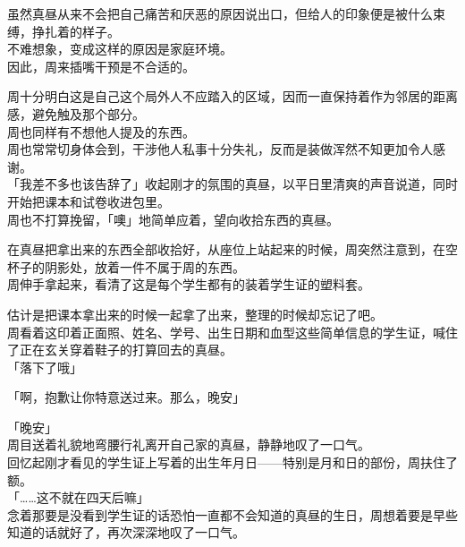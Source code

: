 虽然真昼从来不会把自己痛苦和厌恶的原因说出口，但给人的印象便是被什么束缚，挣扎着的样子。\\

不难想象，变成这样的原因是家庭环境。\\

因此，周来插嘴干预是不合适的。

周十分明白这是自己这个局外人不应踏入的区域，因而一直保持着作为邻居的距离感，避免触及那个部分。\\

周也同样有不想他人提及的东西。\\

周也常常切身体会到，干涉他人私事十分失礼，反而是装做浑然不知更加令人感谢。\\

「我差不多也该告辞了」收起刚才的氛围的真昼，以平日里清爽的声音说道，同时开始把课本和试卷收进包里。\\

周也不打算挽留，「噢」地简单应着，望向收拾东西的真昼。

在真昼把拿出来的东西全部收拾好，从座位上站起来的时候，周突然注意到，在空杯子的阴影处，放着一件不属于周的东西。\\

周伸手拿起来，看清了这是每个学生都有的装着学生证的塑料套。

估计是把课本拿出来的时候一起拿了出来，整理的时候却忘记了吧。\\

周看着这印着正面照、姓名、学号、出生日期和血型这些简单信息的学生证，喊住了正在玄关穿着鞋子的打算回去的真昼。\\

「落下了哦」

「啊，抱歉让你特意送过来。那么，晚安」

「晚安」\\

周目送着礼貌地弯腰行礼离开自己家的真昼，静静地叹了一口气。\\

回忆起刚才看见的学生证上写着的出生年月日——特别是月和日的部份，周扶住了额。\\

「……这不就在四天后嘛」\\

念着那要是没看到学生证的话恐怕一直都不会知道的真昼的生日，周想着要是早些知道的话就好了，再次深深地叹了一口气。
